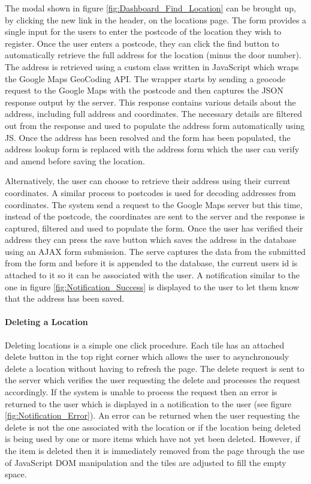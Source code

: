 The modal shown in figure \ref{fig:Dashboard_Find_Location} can be brought up, by clicking the new link in the header, on the locations page. The form provides a single input for the users to enter the postcode of the location they wish to register. Once the user enters a postcode, they can click the find button to automatically retrieve the full address for the location (minus the door number). The address is retrieved using a custom class written in JavaScript which wraps the Google Maps GeoCoding API. The wrapper starts by sending a geocode request to the Google Maps with the postcode and then captures the JSON response output by the server. This response contains various details about the address, including full address and coordinates. The necessary details are filtered out from the response and used to populate the address form automatically using JS. Once the address has been resolved and the form has been populated, the address lookup form is replaced with the address form which the user can verify and amend before saving the location.

Alternatively, the user can choose to retrieve their address using their current coordinates. A similar process to postcodes is used for decoding addresses from coordinates. The system send a request to the Google Maps server but this time, instead of the postcode, the coordinates are sent to the server and the response is captured, filtered and used to populate the form. Once the user has verified their address they can press the save button which saves the address in the database using an AJAX form submission. The serve captures the data from the submitted from the form and before it is appended to the database, the current users id is attached to it so it can be associated with the user. A notification similar to the one in figure \ref{fig:Notification_Success} is displayed to the user to let them know that the address has been saved.

\paragraph{Deleting a Location}
Deleting locations is a simple one click procedure. Each tile has an attached delete button in the top right corner which allows the user to asynchronously delete a location without having to refresh the page. The delete request is sent to the server which verifies the user requesting the delete and processes the request accordingly. If the system is unable to process the request then an error is returned to the user which is displayed in a notification to the user (see figure \ref{fig:Notification_Error}). An error can be returned when the user requesting the delete is not the one associated with the location or if the location being deleted is being used by one or more items which have not yet been deleted. However, if the item is deleted then it is immediately removed from the page through the use of JavaScript DOM manipulation and the tiles are adjusted to fill the empty space.

